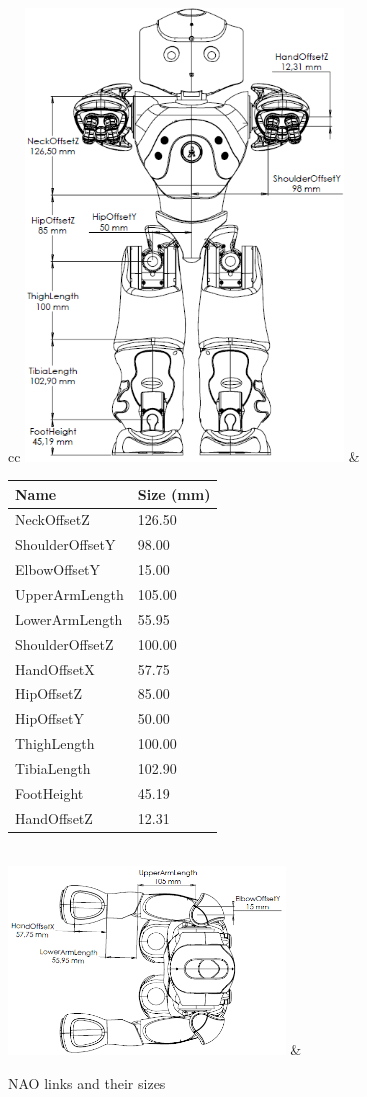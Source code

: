 \begin{figure}
\begin{tabular}{cc}
\includegraphics[height=12cm]{Figures/naolinks_1.png}
& 
\begin{tabular}{|l|l|}
\hline
{\textbf{Name}} & \textbf{Size (mm)} \\ \hline
{NeckOffsetZ} & 126.50 \\ \hline
{ShoulderOffsetY} & 98.00 \\  \hline
{ElbowOffsetY} & 15.00 \\  \hline
{UpperArmLength} & 105.00 \\  \hline
{LowerArmLength} & 55.95 \\  \hline
{ShoulderOffsetZ} & 100.00 \\  \hline
{HandOffsetX} & 57.75 \\  \hline
{HipOffsetZ} & 85.00 \\  \hline
{HipOffsetY} & 50.00 \\  \hline
{ThighLength} & 100.00 \\  \hline
{TibiaLength} & 102.90 \\  \hline
{FootHeight} & 45.19 \\  \hline
{HandOffsetZ} & 12.31 \\ \hline
\end{tabular}
\\
\includegraphics[height = 5cm]{Figures/naolinks_2.png}
&
\\
\end{tabular}
\caption{NAO links and their sizes}
\label{fig:NAOlinks}
\end{figure}


